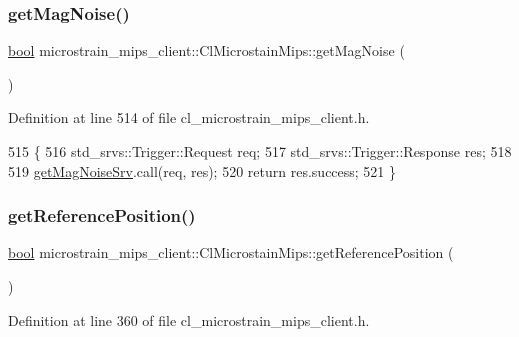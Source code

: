 \subsubsection{\texorpdfstring{get\+Mag\+Noise()}{getMagNoise()}}
{\footnotesize\ttfamily \hyperlink{classbool}{bool} microstrain\+\_\+mips\+\_\+client\+::\+Cl\+Microstain\+Mips\+::get\+Mag\+Noise (\begin{DoxyParamCaption}{ }\end{DoxyParamCaption})\hspace{0.3cm}{\ttfamily [inline]}}



Definition at line 514 of file cl\+\_\+microstrain\+\_\+mips\+\_\+client.\+h.


\begin{DoxyCode}
515     \{
516         std\_srvs::Trigger::Request req;
517         std\_srvs::Trigger::Response res;
518 
519         \hyperlink{classmicrostrain__mips__client_1_1ClMicrostainMips_affa7889c18ffeb92257cc63d1308a499}{getMagNoiseSrv}.call(req, res);
520         \textcolor{keywordflow}{return} res.success;
521     \}
\end{DoxyCode}
\mbox{\label{classmicrostrain__mips__client_1_1ClMicrostainMips_a34ae5d2450f693e5e8c8e58786118a05}} 
\subsubsection{\texorpdfstring{get\+Reference\+Position()}{getReferencePosition()}}
{\footnotesize\ttfamily \hyperlink{classbool}{bool} microstrain\+\_\+mips\+\_\+client\+::\+Cl\+Microstain\+Mips\+::get\+Reference\+Position (\begin{DoxyParamCaption}{ }\end{DoxyParamCaption})\hspace{0.3cm}{\ttfamily [inline]}}



Definition at line 360 of file cl\+\_\+microstrain\+\_\+mips\+\_\+client.\+h.


